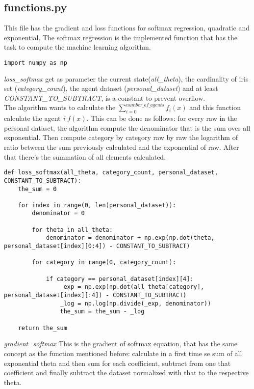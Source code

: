\documentclass[a4paper,11pt,oneside]{book}
\begin{document}
\subsection{functions.py}

This file has the gradient and loss functions for softmax regression, quadratic and exponential. The softmax regression is the implemented function
that has the task to compute the machine learning algorithm.

\begin{lstlisting}
import numpy as np
\end{lstlisting}

\textit{loss\_softmax} get as parameter the current state(\textit{all\_theta}), the cardinality of iris set (\textit{category\_count}), the agent
dataset (\textit{personal\_dataset}) and at least \textit{CONSTANT\_TO\_SUBTRACT}, is a constant to prevent overflow.\\
The algorithm wants to calculate the $\displaystyle\sum_{i=0}^{number\_of\_agents} f_{i}(x)$ and this function calculate the agent \textit{i}
$f(x)$. This can be done as follows: for every raw in the personal dataset, the algorithm compute the denominator that is the sum over all
exponential. Then compute category by category raw by raw the logarithm of ratio between the sum previously calculated and the exponential of raw.
After that there's the summation of all elements calculated.

\begin{lstlisting}
def loss_softmax(all_theta, category_count, personal_dataset, CONSTANT_TO_SUBTRACT):
    the_sum = 0

    for index in range(0, len(personal_dataset)):
        denominator = 0

        for theta in all_theta:
            denominator = denominator + np.exp(np.dot(theta, personal_dataset[index][0:4]) - CONSTANT_TO_SUBTRACT)

        for category in range(0, category_count):

            if category == personal_dataset[index][4]:
                _exp = np.exp(np.dot(all_theta[category], personal_dataset[index][:4]) - CONSTANT_TO_SUBTRACT)
                _log = np.log(np.divide(_exp, denominator))
                the_sum = the_sum - _log

    return the_sum
\end{lstlisting}

\textit{gradient\_softmax} This is the gradient of softmax equation, that has the same concept as the function mentioned before: calculate in a
first time se sum of all exponential theta and then sum for each coefficient, subtract from one that coefficient and finally subtract the dataset
normalized with that to the respective theta.
\end{document}
